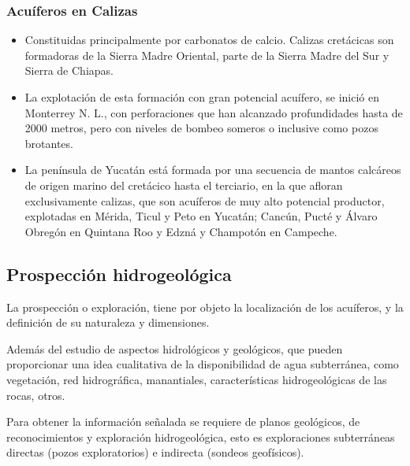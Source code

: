 \subsubsection{Acuíferos en Calizas}
\begin{itemize}
    \item Constituidas principalmente por carbonatos de calcio. Calizas cretácicas son formadoras de la Sierra Madre Oriental, parte de la Sierra Madre del Sur y Sierra de Chiapas.
    \item La explotación de esta formación con gran potencial acuífero, se inició en Monterrey N. L., con perforaciones que han alcanzado profundidades hasta de 2000 metros, pero con niveles de bombeo someros o inclusive como pozos brotantes.
    \item La península de Yucatán está formada por una secuencia de mantos calcáreos de origen marino del cretácico hasta el terciario, en la que afloran exclusivamente calizas, que son acuíferos de muy alto potencial productor, explotadas en Mérida, Ticul y Peto en Yucatán; Cancún, Pucté y Álvaro Obregón en Quintana Roo y Edzná y Champotón en Campeche.
\end{itemize}
\subsection{Prospección hidrogeológica}
La prospección o exploración, tiene por objeto la localización de los acuíferos, y la definición de su naturaleza y dimensiones.

Además del estudio de aspectos hidrológicos y geológicos, que pueden proporcionar una idea cualitativa de la disponibilidad de agua subterránea, como vegetación, red hidrográfica, manantiales, características hidrogeológicas de las rocas, otros.

Para obtener la información señalada se requiere de planos geológicos, de reconocimientos y exploración hidrogeológica, esto es exploraciones subterráneas directas (pozos exploratorios) e indirecta (sondeos geofísicos).

